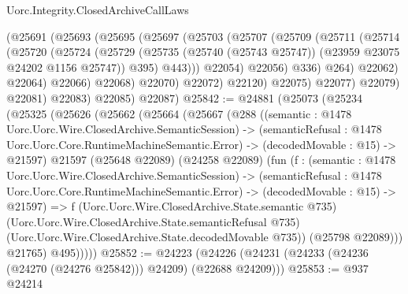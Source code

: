 \begin{lexlean}{Uorc.Integrity.ClosedArchiveCallLaws}
\begin{coremodule}
                        (@25691
                          (@25693
                            (@25695
                              (@25697
                                (@25703
                                  (@25707
                                    (@25709
                                      (@25711
                                        (@25714
                                          (@25720
                                            (@25724
                                              (@25729
                                                (@25735
                                                  (@25740 (@25743 @25747))
                                                  (@23959 @23075 @24202 @1156 @25747))
                                                @395)
                                              @443)))
                                        @22054)
                                      @22056)
                                    @336)
                                  @264)
                                @22062)
                              @22064)
                            @22066)
                          @22068)
                        @22070)
                      @22072)
                    @22120)
                  @22075)
                @22077)
              @22079)
            @22081)
          @22083)
        @22085)
      @22087)
@25842 := @24881
    (@25073
      (@25234
        (@25325
          (@25626
            (@25662
              (@25664
                (@25667
                  (@288
                    ((semantic : @1478 Uorc.Uorc.Wire.ClosedArchive.SemanticSession) ->
                    (semanticRefusal : @1478 Uorc.Uorc.Core.RuntimeMachineSemantic.Error) ->
                    (decodedMovable : @15) -> @21597)
                    @21597
                    (@25648 @22089)
                    (@24258 @22089)
                    (fun (f : (semantic : @1478 Uorc.Uorc.Wire.ClosedArchive.SemanticSession) ->
                    (semanticRefusal : @1478 Uorc.Uorc.Core.RuntimeMachineSemantic.Error) ->
                    (decodedMovable : @15) -> @21597) =>
                    f
                      (Uorc.Uorc.Wire.ClosedArchive.State.semantic @735)
                      (Uorc.Uorc.Wire.ClosedArchive.State.semanticRefusal @735)
                      (Uorc.Uorc.Wire.ClosedArchive.State.decodedMovable @735))
                    (@25798 @22089)))
                @21765)
              @495)))))
@25852 := @24223 (@24226 (@24231 (@24233 (@24236 (@24270 (@24276 @25842))) @24209) (@22688 @24209)))
@25853 := @937 @24214

\end{coremodule}
\end{lexlean}
